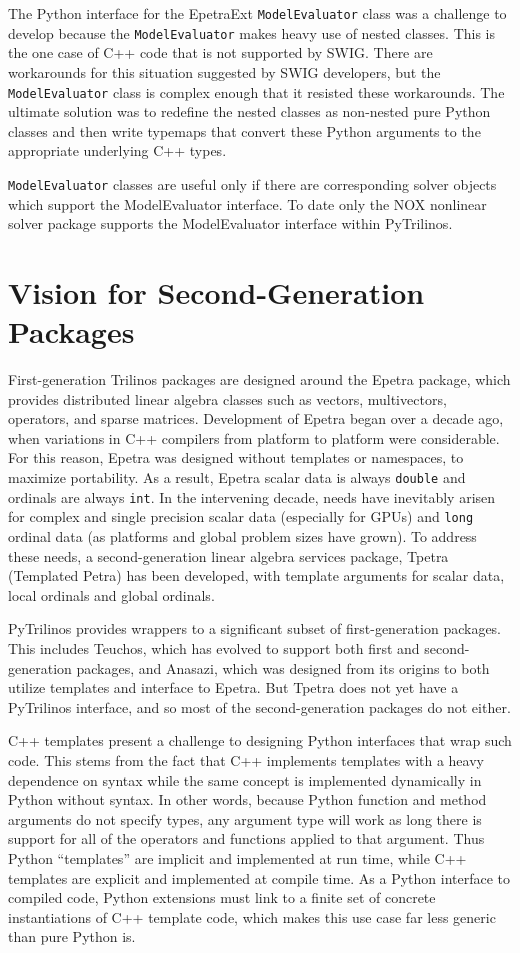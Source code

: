 \documentclass[11pt]{article}
\begin{document}
The Python interface for the EpetraExt {\tt ModelEvaluator} class was a challenge to develop because the {\tt ModelEvaluator} makes heavy use of nested classes.  This is the one case of C++ code that is not supported by SWIG.  There are workarounds for this situation suggested by SWIG developers, but the {\tt ModelEvaluator} class is complex enough that it resisted these workarounds.  The ultimate solution was to redefine the nested classes as non-nested pure Python classes and then write typemaps that convert these Python arguments to the appropriate underlying C++ types.

{\tt ModelEvaluator} classes are useful only if there are corresponding solver objects which support the ModelEvaluator interface.  To date only the NOX nonlinear solver package supports the ModelEvaluator interface within PyTrilinos.

\section{Vision for Second-Generation Packages}
\label{sec:vision}

First-generation Trilinos packages are designed around the Epetra package, which provides distributed linear algebra classes such as vectors, multivectors, operators, and sparse matrices.  Development of Epetra began over a decade ago, when variations in C++ compilers from platform to platform were considerable.  For this reason, Epetra was designed without templates or namespaces, to maximize portability.  As a result, Epetra scalar data is always {\tt double} and ordinals are always {\tt int}.  In the intervening decade, needs have inevitably arisen for complex and single precision scalar data (especially for GPUs) and {\tt long} ordinal data (as platforms and global problem sizes have grown).  To address these needs, a second-generation linear algebra services package, Tpetra (Templated Petra) has been developed, with template arguments for scalar data, local ordinals and global ordinals.

PyTrilinos provides wrappers to a significant subset of first-generation packages.  This includes Teuchos, which has evolved to support both first and second-generation packages, and Anasazi, which was designed from its origins to both utilize templates and interface to Epetra.  But Tpetra does not yet have a PyTrilinos interface, and so most of the second-generation packages do not either.

C++ templates present a challenge to designing Python interfaces that wrap such code.  This stems from the fact that C++ implements templates with a heavy dependence on syntax while the same concept is implemented dynamically in Python without syntax.  In other words, because Python function and method arguments do not specify types, any argument type will work as long there is support for all of the operators and functions applied to that argument.  Thus Python ``templates'' are implicit and implemented at run time, while C++ templates are explicit and implemented at compile time.  As a Python interface to compiled code, Python extensions must link to a finite set of concrete instantiations of C++ template code, which makes this use case far less generic than pure Python is.
\end{document}
